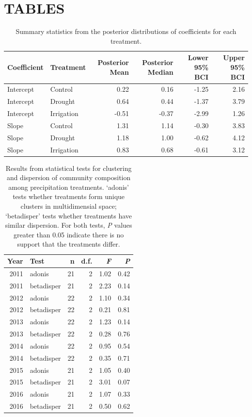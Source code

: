 \documentclass[fleqn,10pt,lineno]{wlpeerj} %
\begin{document}
\newpage{}

\section{TABLES}\label{tables}

\begin{table}[ht]
\centering
\caption{Summary statistics from the posterior distributions of coefficients for each treatment.} 
\begingroup\normalsize
\begin{tabular}{llrrrr}
  \hline
Coefficient & Treatment & Posterior Mean & Posterior Median & Lower 95\% BCI & Upper 95\% BCI \\ 
  \hline
Intercept & Control & 0.22 & 0.16 & -1.25 & 2.16 \\ 
  Intercept & Drought & 0.64 & 0.44 & -1.37 & 3.79 \\ 
  Intercept & Irrigation & -0.51 & -0.37 & -2.99 & 1.26 \\ 
  Slope & Control & 1.31 & 1.14 & -0.30 & 3.83 \\ 
  Slope & Drought & 1.18 & 1.00 & -0.62 & 4.12 \\ 
  Slope & Irrigation & 0.83 & 0.68 & -0.61 & 3.12 \\ 
   \hline
\end{tabular}
\endgroup
\end{table}\begin{table}[ht]
\centering
\caption{Results from statistical tests for clustering and dispersion of community composition among precipitation treatments. `adonis' tests whether treatments form unique clusters in multidimensial space; `betadisper' tests whether treatments have similar dispersion. For both tests, \emph{P} values greater than 0.05 indicate there is no support that the treatments differ.} 
\begingroup\normalsize
\begin{tabular}{rlrrrr}
  \hline
Year & Test & n & d.f. & \emph{F} & \emph{P} \\ 
  \hline
2011 & adonis &  21 &   2 & 1.02 & 0.42 \\ 
  2011 & betadisper &  21 &   2 & 2.23 & 0.14 \\ 
  2012 & adonis &  22 &   2 & 1.10 & 0.34 \\ 
  2012 & betadisper &  22 &   2 & 0.21 & 0.81 \\ 
  2013 & adonis &  22 &   2 & 1.23 & 0.14 \\ 
  2013 & betadisper &  22 &   2 & 0.28 & 0.76 \\ 
  2014 & adonis &  22 &   2 & 0.95 & 0.54 \\ 
  2014 & betadisper &  22 &   2 & 0.35 & 0.71 \\ 
  2015 & adonis &  21 &   2 & 1.05 & 0.40 \\ 
  2015 & betadisper &  21 &   2 & 3.01 & 0.07 \\ 
  2016 & adonis &  21 &   2 & 1.07 & 0.33 \\ 
  2016 & betadisper &  21 &   2 & 0.50 & 0.62 \\ 
   \hline
\end{tabular}
\endgroup
\end{table}
\end{document}
